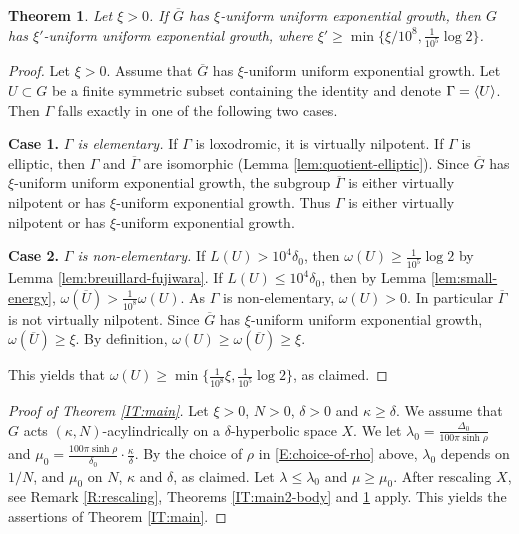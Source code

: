 \documentclass[leqno,a4paper,10pt]{amsart}
\theoremstyle{plain}
\newtheorem{thm}{Theorem}[section]
\theoremstyle{definition}
\theoremstyle{remark}
\newcommand{\q}[1]{\overline{#1}}
\let\le\leqslant
\let\ge\geqslant
\newcommand{\group}[1]{
	\mathchoice%
	{\left\langle #1\right\rangle}%
	{\langle #1\rangle}%
	{\langle #1\rangle}%
	{\langle #1\rangle}%
}
\begin{document}
\begin{thm}%
	\label{IT:main3-body}
	 Let $\xi>0$. If $\q G$ has $\xi$-uniform uniform exponential growth, then $G$ has $\xi'$-uniform uniform exponential growth, where $\xi'\ge \min\{\xi/10^8,\frac{1}{10^5}\log 2\}$.
\end{thm}


\begin{proof}
Let $\xi>0$. Assume that $\q G$ has $\xi$-uniform uniform exponential growth. Let $U\subset G$ be a finite symmetric subset containing the identity and denote $\Gamma=\group{U}$. Then $\Gamma$ falls exactly in one of the following two cases.

\textbf{Case 1.} \emph{$\Gamma$ is elementary.} If $\Gamma$ is loxodromic, it is virtually nilpotent. If $\Gamma$ is elliptic, then $\Gamma$ and $\q \Gamma$ are isomorphic (Lemma \ref{lem:quotient-elliptic}). Since $\q G$ has $\xi$-uniform uniform exponential growth, the subgroup $\q \Gamma$ is either virtually nilpotent or has $\xi$-uniform exponential growth. Thus $\Gamma$ is either virtually nilpotent or has $\xi$-uniform exponential growth.

\textbf{Case 2.} \emph{$\Gamma$ is non-elementary.} If $L(U)>10^4\delta_0$, then $\omega(U) \ge \frac{1}{10^5} \log 2$ by Lemma \ref{lem:breuillard-fujiwara}. 
	If $L(U)\le 10^4\delta_0$, then 
 by Lemma \ref{lem:small-energy}, $\omega(\q U)>\frac{1}{10^8}\omega(U)$. As $\Gamma$ is non-elementary, $\omega(U)>0$. In particular $\q \Gamma$ is not virtually nilpotent. Since $\q G$ has $\xi$-uniform uniform exponential growth, $\omega(\q U) \ge \xi$. By definition, $\omega(U)\ge \omega(\q U)\ge \xi$. 
 
 This yields that $\omega(U) \geqslant \min \{\frac{1}{10^8} \xi,\frac{1}{10^5} \log 2\}$, as claimed. 
\end{proof}

\begin{proof}[Proof of Theorem \ref{IT:main}] Let $\xi>0$, $N>0$, $\delta >0$ and $\kappa \geqslant \delta$. We assume that $G$ acts $(\kappa,N)$-acylindrically on a $\delta$-hyperbolic space $X$. We let $\lambda_0=  \frac{\Delta_0}{100\pi\sinh\rho}$  and $ \mu_0=\frac{100\pi \sinh \rho}{\delta_0}\cdot \frac{\kappa}{\delta}.$ By the choice of $\rho$ in \eqref{E:choice-of-rho} above, $\lambda_0$ depends on $1/N$, and $\mu_0$ on $N$, $\kappa$ and $\delta$, as claimed.  Let $\lambda\le \lambda_0$  and $ \mu\ge \mu_0.$ 
 After rescaling $X$, see Remark \ref{R:rescaling}, Theorems \ref{IT:main2-body} and \ref{IT:main3-body} apply. This yields the assertions of Theorem \ref{IT:main}. 
\end{proof}
\end{document}
